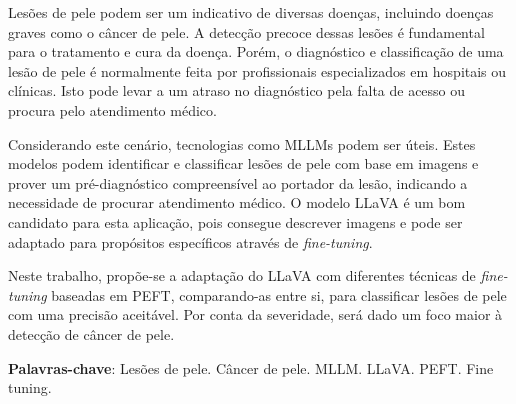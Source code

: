 \imprimircapa

\imprimirfolhaderosto*

\begin{fichacatalografica}
	
\end{fichacatalografica}



% 

\setlength{\absparsep}{18pt}
\begin{resumo}
	\SingleSpacing
	Lesões de pele podem ser um indicativo de diversas doenças, incluindo doenças graves como o câncer de pele. A detecção precoce dessas lesões é fundamental para o
	tratamento e cura da doença. Porém, o diagnóstico e classificação de uma lesão de pele é normalmente feita por profissionais especializados em hospitais ou clínicas.
	Isto pode levar a um atraso no diagnóstico pela falta de acesso ou procura pelo atendimento médico.

	Considerando este cenário, tecnologias como \ac{MLLMs} podem ser úteis. Estes modelos podem identificar e classificar lesões de pele com base em imagens e prover um
	pré-diagnóstico compreensível ao portador da lesão, indicando a necessidade de procurar atendimento médico. O modelo \ac{LLaVA} é um bom candidato para esta
	aplicação, pois consegue descrever imagens e pode ser adaptado para propósitos específicos através de \textit{fine-tuning}.

	Neste trabalho, propõe-se a adaptação do \ac{LLaVA} com diferentes técnicas de \textit{fine-tuning} baseadas em \ac{PEFT}, comparando-as entre si, para
	classificar lesões de pele com uma precisão aceitável. Por conta da severidade, será dado um foco maior à detecção de câncer de pele.

	\textbf{Palavras-chave}: Lesões de pele. Câncer de pele. MLLM. LLaVA. PEFT. Fine tuning.
\end{resumo}

